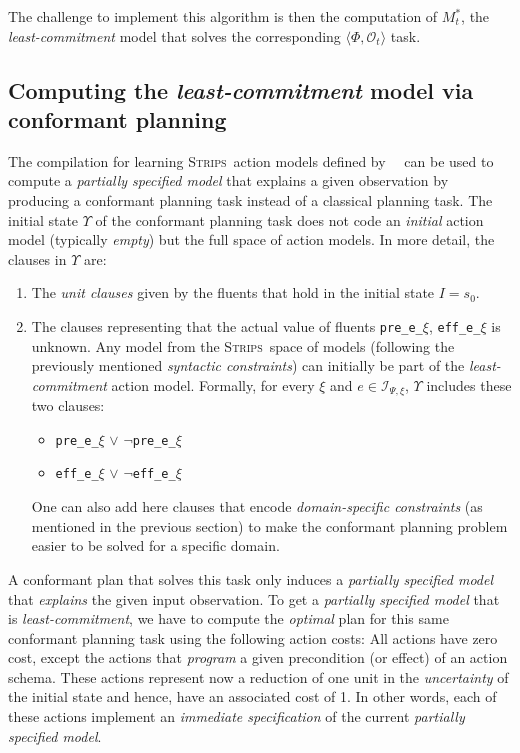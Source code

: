 \documentclass{article}
\newcommand{\tup}[1]{{\langle #1 \rangle}}
\newcommand{\strips}{\textsc{Strips}}
\begin{document}
The challenge to implement this algorithm is then the computation of $M^*_t$, the {\em least-commitment} model that solves the corresponding $\tup{\Phi,\mathcal{O}_t}$ task.

\subsection{Computing the {\em least-commitment} model via conformant planning}
The compilation for learning \strips\ action models defined by~\citeauthor{aineto2018learning}~\citeyear{aineto2018learning} can be used to compute a {\em partially specified model} that explains a given observation by producing a conformant planning task instead of a classical planning task. The initial state $\Upsilon$ of the conformant planning task does not code an {\em initial} action model (typically {\em empty}) but the full space of action models. In more detail, the clauses in $\Upsilon$ are:
      \begin{enumerate}
      \item The {\em unit clauses} given by the fluents that hold in the initial state $I=s_0$.
      \item The clauses representing that the actual value of fluents {\tt\small pre\_e\_$\xi$}, {\tt\small eff\_e\_$\xi$} is unknown. Any model from the \strips\ space of models (following the previously mentioned {\em syntactic constraints}) can initially be part of the {\em least-commitment} action model. Formally, for every $\xi$ and $e\in{\mathcal I}_{\Psi,\xi}$, $\Upsilon$ includes these two clauses:
            \begin{itemize}
            \item {\tt\small pre\_e\_$\xi$} $\vee$ {\tt\small $\neg$pre\_e\_$\xi$}
            \item {\tt\small eff\_e\_$\xi$} $\vee$ {\tt\small $\neg$eff\_e\_$\xi$}
            \end{itemize}
            One can also add here clauses that encode {\em domain-specific constraints} (as mentioned in the previous section) to make the conformant planning problem easier to be solved for a specific domain.
      \end{enumerate}
A conformant plan that solves this task only induces a {\em partially specified model} that {\em explains} the given input observation. To get a {\em partially specified model} that is {\em least-commitment}, we have to compute the {\em optimal} plan for this same conformant planning task using the following action costs: All actions have zero cost, except the actions that {\em program} a given precondition (or effect) of an action schema. These actions represent now a reduction of one unit in the {\em uncertainty} of the initial state and hence, have an associated cost of 1. In other words, each of these actions implement an {\em immediate specification} of the current {\em partially specified model}. 
\end{document}
